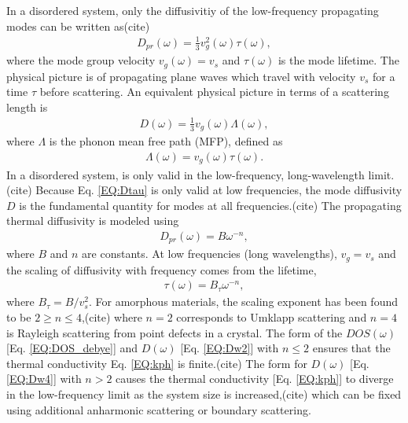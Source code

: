 \documentclass[aps,prb,onecolumn,preprint,superscriptaddress,footinbib,amsmath,amssymb,floatfix]{revtex4}
\begin{document}
In a disordered system, only the diffusivitiy of the low-frequency 
propagating modes can be written as(cite)     
\begin{equation}\label{EQ:Dtau}
\begin{split}
D_{pr}(\omega) = \frac{1}{3}v^2_g(\omega)\tau(\omega),
\end{split}
\end{equation}
where the mode group velocity $v_g(\omega) = v_s$ and $\tau(\omega)$ is 
the mode lifetime. 
The physical picture is of propagating plane waves which 
travel with velocity $v_s$ for a time $\tau$ before scattering. 
An equivalent physical picture in terms of a scattering length 
is
\begin{equation}\label{EQ:DLambda}
\begin{split}
D(\omega) = \frac{1}{3}v_g(\omega) \Lambda(\omega),
\end{split}
\end{equation}
where $\Lambda$ is the phonon mean free path (MFP), defined as 
\begin{equation}\label{EQ:Lambda}
\begin{split}
\Lambda(\omega) = v_{g}(\omega) \tau(\omega).
\end{split}
\end{equation}
In a disordered system,  is only valid in the 
low-frequency, long-wavelength limit.(cite) 
Because Eq. \eqref{EQ:Dtau} is only valid at low frequencies, 
the mode diffusivity $D$ is the fundamental quantity for modes at all 
frequencies.(cite)  
The propagating thermal diffusivity is modeled using 
\begin{equation}\label{EQ:Dw2}
\begin{split}
D_{pr}(\omega) = B\omega^{-n}, 
\end{split}
\end{equation}
where $B$ and $n$ are constants.   
At low frequencies (long wavelengths), $v_g = v_s$ and the scaling of 
diffusivity with frequency comes from the lifetime, 
\begin{equation}\label{EQ:tauw2}
\begin{split}
\tau(\omega) = B_{\tau} \omega^{-n},
\end{split}
\end{equation}
where $B_{\tau} = B/v_s^2$. For amorphous materials, the scaling exponent has been 
found to be $2\ge n \le 4$,(cite) 
where $n=2$ corresponds to 
Umklapp scattering\cite{callaway_model_1959} and $n=4$ is Rayleigh scattering 
from point defects in a crystal.\cite{klemens_scattering_1955}
The form of the $DOS(\omega)$ [Eq. \eqref{EQ:DOS_debye}] 
and $D(\omega)$ [Eq. \eqref{EQ:Dw2}] with $n\le2$  
ensures that the 
thermal conductivity Eq. \eqref{EQ:kph} is finite.(cite) The form for $D(\omega)$ 
[Eq. \eqref{EQ:Dw4}] with $n>2$ causes the thermal conductivity 
[Eq. \eqref{EQ:kph}] to diverge 
in the low-frequency limit as the system size is increased,(cite) 
which can be fixed using additional anharmonic scattering
\cite{feldman_thermal_1993,feldman_numerical_1999} or 
boundary scattering.\cite{cahill_lower_1994,liu_high_2009,yang_anomalously_2010}
\end{document}
